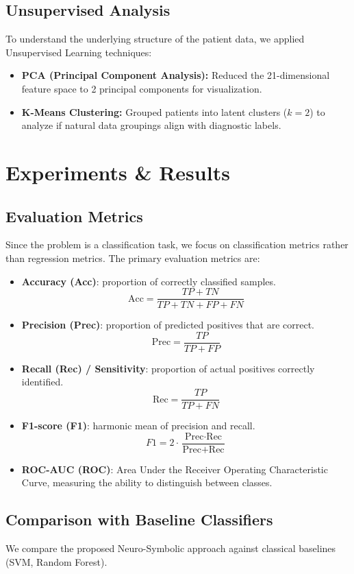 \documentclass[conference]{IEEEtran}
\begin{document}
\subsection{Unsupervised Analysis}
 To understand the underlying structure of the patient data, we applied Unsupervised Learning techniques:
\begin{itemize}
    \item \textbf{PCA (Principal Component Analysis):} Reduced the 21-dimensional feature space to 2 principal components for visualization.
    \item \textbf{K-Means Clustering:} Grouped patients into latent clusters ($k=2$) to analyze if natural data groupings align with diagnostic labels.
\end{itemize}

\section{Experiments \& Results}

\subsection{Evaluation Metrics}
Since the problem is a classification task, we focus on classification metrics rather than regression metrics. The primary evaluation metrics are:
\begin{itemize}
    \item \textbf{Accuracy (Acc)}: proportion of correctly classified samples.
    \[ \text{Acc} = \frac{TP + TN}{TP + TN + FP + FN} \]
    \item \textbf{Precision (Prec)}: proportion of predicted positives that are correct.
    \[ \text{Prec} = \frac{TP}{TP + FP} \]
    \item \textbf{Recall (Rec) / Sensitivity}: proportion of actual positives correctly identified.
    \[ \text{Rec} = \frac{TP}{TP + FN} \]
    \item \textbf{F1-score (F1)}: harmonic mean of precision and recall.
    \[ F1 = 2 \cdot \frac{\text{Prec} \cdot \text{Rec}}{\text{Prec} + \text{Rec}} \]
    \item \textbf{ROC-AUC (ROC)}: Area Under the Receiver Operating Characteristic Curve, measuring the ability to distinguish between classes.
\end{itemize}

\subsection{Comparison with Baseline Classifiers}
 We compare the proposed Neuro-Symbolic approach against classical baselines (SVM, Random Forest).
\end{document}
